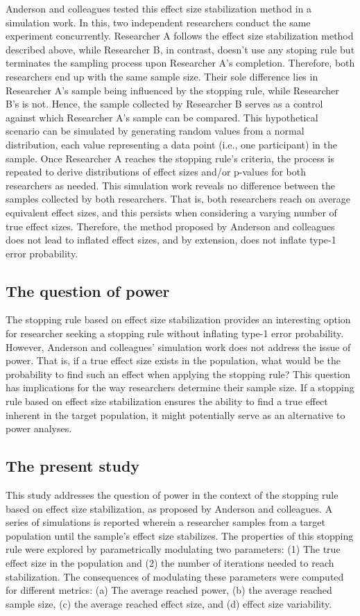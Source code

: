 \documentclass[12pt]{article}
\begin{document}
    Anderson and colleagues tested this effect size stabilization method in a simulation work. In this, two independent researchers conduct the same experiment concurrently. Researcher A follows the effect size stabilization method described above, while Researcher B, in contrast, doesn't use any stoping rule but terminates the sampling process upon Researcher A's completion. Therefore, both researchers end up with the same sample size. Their sole difference lies in Researcher A's sample being influenced by the stopping rule, while Researcher B's is not. Hence, the sample collected by Researcher B serves as a control against which Researcher A's sample can be compared. This hypothetical scenario can be simulated by generating random values from a normal distribution, each value representing a data point (i.e., one participant) in the sample. Once Researcher A reaches the stopping rule's criteria, the process is repeated to derive distributions of effect sizes and/or p-values for both researchers as needed. This simulation work reveals no difference between the samples collected by both researchers. That is, both researchers reach on average equivalent effect sizes, and this persists when considering a varying number of true effect sizes. Therefore, the method proposed by Anderson and colleagues does not lead to inflated effect sizes, and by extension, does not inflate type-1 error probability.

    \subsection{The question of power}
    The stopping rule based on effect size stabilization provides an interesting option for researcher seeking a stopping rule without inflating type-1 error probability. However, Anderson and colleagues' simulation work does not address the issue of power. That is, if a true effect size exists in the population, what would be the probability to find such an effect when applying the stopping rule? This question has implications for the way researchers determine their sample size. If a stopping rule based on effect size stabilization ensures the ability to find a true effect inherent in the target population, it might potentially serve as an alternative to power analyses.

    \subsection{The present study}
    This study addresses the question of power in the context of the stopping rule based on effect size stabilization, as proposed by Anderson and colleagues. A series of simulations is reported wherein a researcher samples from a target population until the sample's effect size stabilizes. The properties of this stopping rule were explored by parametrically modulating two parameters: (1) The true effect size in the population and (2) the number of iterations needed to reach stabilization. The consequences of modulating these parameters were computed for different metrics: (a) The average reached power, (b) the average reached sample size, (c) the average reached effect size, and (d) effect size variability.
\end{document}
